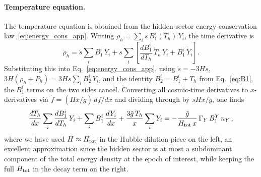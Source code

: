 \documentclass[11pt]{article}
\numberwithin{equation}{section}
\newcommand{\TD}{T_h}
\begin{document}
\paragraph{Temperature equation.}
 
The temperature equation is obtained from the hidden-sector energy conservation law~\eqref{eq:energy_cons_app}. Writing $\rho_h = \sum_i s\,B_1^i(\TD)\,Y_i$, the time derivative is
\begin{equation}
  \dot\rho_h = \dot s\sum_i B_1^i\,Y_i + s\sum_i\!\left[\frac{dB_1^i}{d\TD}\,\dot\TD\,Y_i + B_1^i\,\dot Y_i\right].
\end{equation}
Substituting this into Eq.~\eqref{eq:energy_cons_app}, using $\dot s = -3Hs$, $3H(\rho_h + P_h) = 3Hs\sum_i B_2^i\,Y_i$, and the identity $B_2^i = B_1^i + \TD$ from Eq.~\eqref{eq:B1}, the $B_1^i$ terms on the two sides cancel. Converting all cosmic-time derivatives to $x$-derivatives via $\dot f = (Hx/\tilde g)\,df/dx$ and dividing through by $sHx/\tilde g$, one finds
\begin{equation}
  \frac{d\TD}{dx}\sum_i \frac{dB_1^i}{d\TD}\,Y_i
  + \sum_i B_1^i\,\frac{dY_i}{dx}
  + \frac{3\tilde g\,\TD}{x}\sum_i Y_i
  = -\frac{\tilde g}{H_{\rm tot}\,x}\,\Gamma_Y\,B_1^Y\,n_Y\,,
  \label{eq:energy_x_app}
\end{equation}
where we have used $H\approx H_{\rm tot}$ in the Hubble-dilution piece on the left, an excellent approximation since the hidden sector is at most a subdominant component of the total energy density at the epoch of interest, while keeping the full $H_{\rm tot}$ in the decay term on the right.
 
\end{document}

